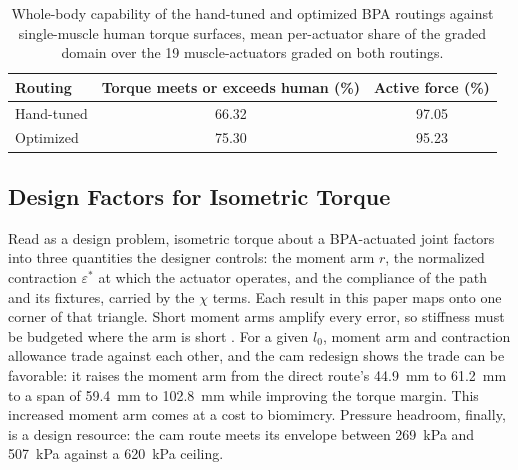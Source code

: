 \documentclass[utf8]{FrontiersinHarvard} %
\renewcommand{\arraystretch}{2}  %
\begin{document}
\begin{table}[H]
\caption{Whole-body capability of the hand-tuned and optimized BPA routings against single-muscle human torque surfaces, mean per-actuator share of the graded domain over the 19 muscle-actuators graded on both routings.}
\label{tab:CapabilitySurvey}
\begingroup
\renewcommand{\arraystretch}{1.4}%
\fontsize{10pt}{12pt}\selectfont
\begin{tabular}{@{}lcc@{}}
\toprule
\textbf{Routing} & \textbf{Torque meets or exceeds human (\%)} & \textbf{Active force (\%)} \\
\midrule
Hand-tuned & 66.32 & 97.05 \\
Optimized & 75.30 & 95.23 \\
\bottomrule
\end{tabular}
\endgroup
\end{table}

\subsection{Design Factors for Isometric Torque}\label{sec:design_factors}

Read as a design problem, isometric torque about a BPA-actuated joint factors into three quantities the designer controls: the moment arm $r$, the normalized contraction $\varepsilon^{*}$ at which the actuator operates, and the compliance of the path and its fixtures, carried by the $\chi$ terms. Each result in this paper maps onto one corner of that triangle. Short moment arms amplify every error, so stiffness must be budgeted where the arm is short \citep{young_analyzing_2019}. For a given $l_{0}$, moment arm and contraction allowance trade against each other, and the cam redesign shows the trade can be favorable: it raises the moment arm from the direct route's \qty{44.9}{\mm} to \qty{61.2}{\mm} to a span of \qty{59.4}{\mm} to \qty{102.8}{\mm} while improving the torque margin. This increased moment arm comes at a cost to biomimcry.  Pressure headroom, finally, is a design resource: the cam route meets its envelope between \qty{269}{\kPa} and \qty{507}{\kPa} against a \qty{620}{\kPa} ceiling.
\end{document}
